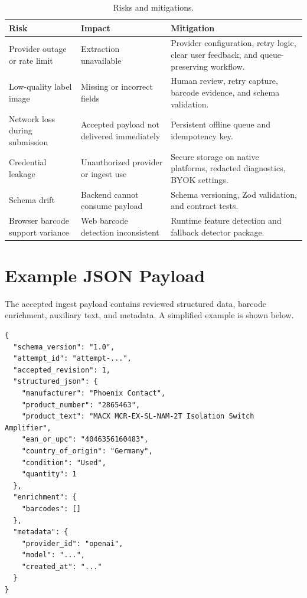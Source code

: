 \begin{table}[htbp]
\centering
\begin{tabularx}{\textwidth}{>{\raggedright\arraybackslash}p{}XX}
\toprule
Risk & Impact & Mitigation \\
\midrule
Provider outage or rate limit & Extraction unavailable & Provider configuration, retry logic, clear user feedback, and queue-preserving workflow. \\
Low-quality label image & Missing or incorrect fields & Human review, retry capture, barcode evidence, and schema validation. \\
Network loss during submission & Accepted payload not delivered immediately & Persistent offline queue and idempotency key. \\
Credential leakage & Unauthorized provider or ingest use & Secure storage on native platforms, redacted diagnostics, BYOK settings. \\
Schema drift & Backend cannot consume payload & Schema versioning, Zod validation, and contract tests. \\
Browser barcode support variance & Web barcode detection inconsistent & Runtime feature detection and fallback detector package. \\
\bottomrule
\end{tabularx}
\caption{Risks and mitigations.}
\label{tab:risks}
\end{table}

\section{Example JSON Payload}

The accepted ingest payload contains reviewed structured data, barcode enrichment, auxiliary text, and metadata. A simplified example is shown below.

\begin{lstlisting}[caption={Simplified accepted ingest payload},label={lst:payload}]
{
  "schema_version": "1.0",
  "attempt_id": "attempt-...",
  "accepted_revision": 1,
  "structured_json": {
    "manufacturer": "Phoenix Contact",
    "product_number": "2865463",
    "product_text": "MACX MCR-EX-SL-NAM-2T Isolation Switch Amplifier",
    "ean_or_upc": "4046356160483",
    "country_of_origin": "Germany",
    "condition": "Used",
    "quantity": 1
  },
  "enrichment": {
    "barcodes": []
  },
  "metadata": {
    "provider_id": "openai",
    "model": "...",
    "created_at": "..."
  }
}
\end{lstlisting}

